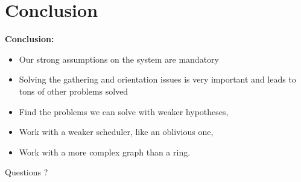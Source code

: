 \documentclass{beamer}
\begin{document}
\section{Conclusion}
\begin{frame}
	\textbf{Conclusion:}
	\begin{itemize}
		\item<2-> Our strong assumptions on the system are mandatory
		\item<3-> Solving the gathering and orientation issues is very important and leads to tons of other problems solved
	\end{itemize}
	
	\begin{itemize}
		\item<5-> Find the problems we can solve with weaker hypotheses,
		\item<6-> Work with a weaker scheduler, like an oblivious one,
		\item<7-> Work with a more complex graph than a ring.
	\end{itemize}
	
\end{frame}
\begin{frame}
	\begin{center}
	\LARGE{Questions ?}
	\end{center}
\end{frame}
\end{document}
